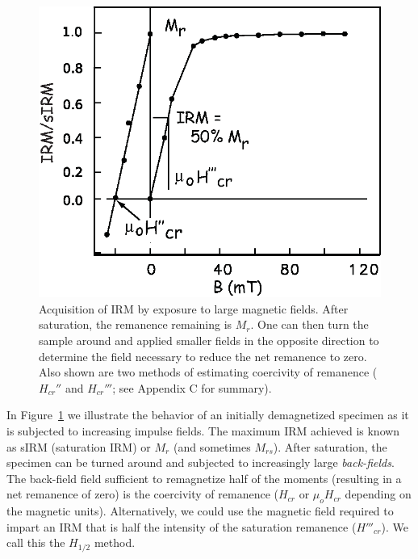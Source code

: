 \begin{figure}[htb]
\centering  \includegraphics{EPSfiles/irm.eps}
\caption{Acquisition of IRM by exposure to large magnetic fields.  After saturation, the remanence remaining is $M_r$.  One can then turn the sample around and applied smaller fields in the opposite direction to determine the field necessary to reduce the net remanence to zero.   Also shown are two methods of estimating coercivity of remanence ($H_{cr}''$ and $H_{cr}'''$; see Appendix C for summary).
 }
\label{fig:irm}
\end{figure}


 In Figure~\ref{fig:irm} we illustrate the behavior of an initially demagnetized specimen as it is subjected to increasing impulse fields.  The maximum IRM achieved is known as 
 sIRM (saturation IRM) or $M_r$ (and sometimes $M_{rs}$).  After saturation, the specimen can be turned around and subjected to increasingly large  
 {\it back-fields}.  The back-field field sufficient to remagnetize half of the moments (resulting in a net remanence of zero) is the coercivity of remanence ($H_{cr}$ or $\mu_o H_{cr}$ depending on the magnetic units).    Alternatively, we  could use the magnetic field required to impart an IRM that is half the intensity of the saturation remanence ($H'''_{cr}$).   We call this the $H_{1/2}$ method.  
 
